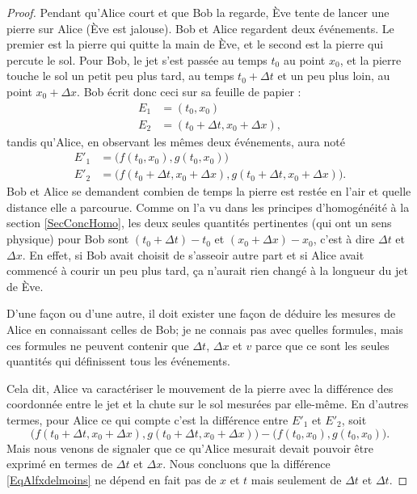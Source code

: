 \begin{proof}
Pendant qu'Alice court et que Bob la regarde, Ève tente de lancer une pierre sur Alice (Ève est jalouse). Bob et Alice regardent deux événements. Le premier est la pierre qui quitte la main de Ève, et le second est la pierre qui percute le sol. Pour Bob, le jet s'est passée au temps $t_0$ au point $x_0$, et la pierre touche le sol un petit peu plus tard, au temps $t_0+\Delta t$ et un peu plus loin, au point $x_0+\Delta x$. Bob écrit donc ceci sur sa feuille de papier :
\[ 
\begin{split}
E_1&=(t_0,x_0)\\
E_2&=(t_0+\Delta t,x_0+\Delta x),
\end{split}  
\]
tandis qu'Alice, en observant les mêmes deux événements, aura noté
\[ 
\begin{split}
E'_1&=\big( f(t_0,x_0),g(t_0,x_0) \big) \\
E'_2&=\big( f(t_0+\Delta t,x_0+\Delta x), g(t_0+\Delta t,x_0+\Delta x) \big).
\end{split}  
\]
Bob et Alice se demandent combien de temps la pierre est restée en l'air et quelle distance elle a parcourue. Comme on l'a vu dans les principes d'homogénéité à la section \ref{SecConcHomo}, les deux seules quantités pertinentes (qui ont un sens physique) pour Bob sont $(t_0+\Delta t)-t_0$ et $(x_0+\Delta x)-x_0$, c'est à dire $\Delta t$ et $\Delta x$. En effet, si Bob avait choisit de s'asseoir autre part et si Alice avait commencé à courir un peu plus tard, ça n'aurait rien changé à la longueur du jet de Ève.

D'une façon ou d'une autre, il doit exister une façon de déduire les mesures de Alice en connaissant celles de Bob; je ne connais pas avec quelles formules, mais ces formules ne peuvent contenir que $\Delta t$, $\Delta x$ et $v$ parce que ce sont les seules quantités qui définissent tous les événements.

Cela dit, Alice va caractériser le mouvement de la pierre avec la différence des coordonnée entre le jet et la chute sur le sol mesurées par elle-même. En d'autres termes, pour Alice ce qui compte c'est la différence entre $E'_1$ et $E'_2$, soit
\begin{equation}	\label{EqAlfxdelmoins}
   \big( f(t_0+\Delta t,x_0+\Delta x), g(t_0+\Delta t,x_0+\Delta x) \big)-\big( f(t_0,x_0),g(t_0,x_0) \big).
\end{equation} 
Mais nous venons de signaler que ce qu'Alice mesurait devait pouvoir être exprimé en termes de $\Delta t$ et $\Delta x$. Nous concluons que la différence \eqref{EqAlfxdelmoins} ne dépend en fait pas de $x$ et $t$ mais seulement de $\Delta t$ et $\Delta t$.


\end{proof}
